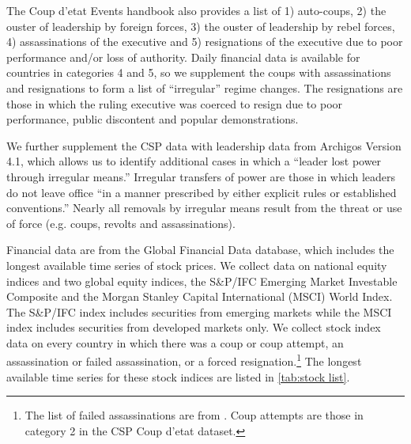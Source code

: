 \documentclass[12pt,final,fleqn]{article}
\theoremstyle{plain}
\begin{document}
The Coup d'etat Events handbook also provides a list of 1) auto-coups, 2) the ouster of leadership by foreign forces, 3) the ouster of leadership by rebel forces, 4) assassinations of the executive and 5) resignations of the executive due to poor performance and/or loss of authority. Daily financial data is available for countries in categories 4 and 5, so we supplement the coups with assassinations and resignations to form a list of ``irregular'' regime changes. The resignations are those in which the ruling executive was coerced to resign due to poor performance, public discontent and popular demonstrations.

We further supplement the CSP data with leadership data from Archigos Version 4.1, which allows us to identify additional cases in which a ``leader lost power through irregular means.'' Irregular transfers of power are those in which leaders do not leave office ``in a manner prescribed by either explicit rules or established conventions.'' Nearly all removals by irregular means result from the threat or use of force (e.g. coups, revolts and assassinations).

Financial data are from the Global Financial Data database, which includes the longest available time series of stock prices. We collect data on national equity indices and two global equity indices, the S\&P/IFC Emerging Market Investable Composite and the Morgan Stanley Capital International (MSCI) World Index. The S\&P/IFC index includes securities from emerging markets while the MSCI index includes securities from developed markets only. We collect stock index data on every country in which there was a coup or coup attempt, an assassination or failed assassination, or a forced resignation.\footnote{The list of failed assassinations are from \citep{jones2009hit}. Coup attempts are those in category 2 in the CSP Coup d'etat dataset.} The longest available time series for these stock indices are listed in \autoref{tab:stock list}.
\end{document}
